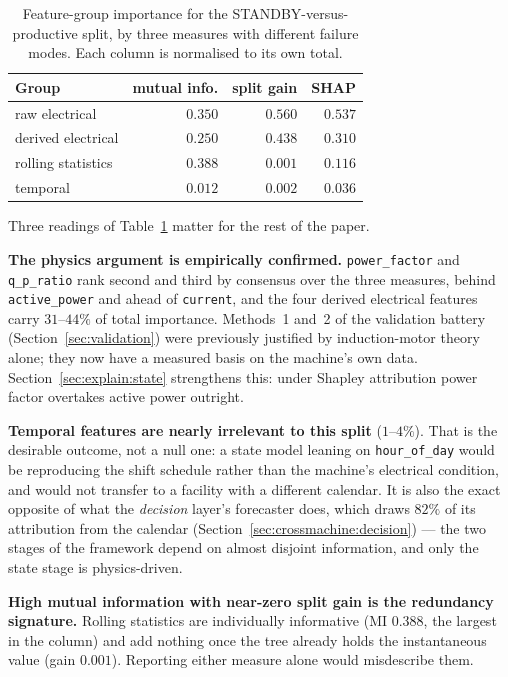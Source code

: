 \begin{table}[t]
\centering
\caption{Feature-group importance for the STANDBY-versus-productive
split, by three measures with different failure modes. Each column is
normalised to its own total.}
\label{tab:feature-groups}
\small
\begin{tabular}{@{}lrrr@{}}
\toprule
Group & mutual info. & split gain & SHAP \\
\midrule
raw electrical      & $0.350$ & $\mathbf{0.560}$ & $\mathbf{0.537}$ \\
derived electrical  & $0.250$ & $0.438$ & $0.310$ \\
rolling statistics  & $\mathbf{0.388}$ & $0.001$ & $0.116$ \\
temporal            & $0.012$ & $0.002$ & $0.036$ \\
\bottomrule
\end{tabular}
\end{table}

Three readings of Table~\ref{tab:feature-groups} matter for the rest of
the paper.

\textbf{The physics argument is empirically confirmed.}
\texttt{power\_factor} and \texttt{q\_p\_ratio} rank second and third by
consensus over the three measures, behind \texttt{active\_power} and
ahead of \texttt{current}, and the four derived electrical features
carry $31$--$44\%$ of total importance. Methods~1 and~2 of the
validation battery (Section~\ref{sec:validation}) were previously
justified by induction-motor theory alone; they now have a measured
basis on the machine's own data. Section~\ref{sec:explain:state}
strengthens this: under Shapley attribution power factor overtakes
active power outright.

\textbf{Temporal features are nearly irrelevant to this split}
($1$--$4\%$). That is the desirable outcome, not a null one: a state
model leaning on \texttt{hour\_of\_day} would be reproducing the shift
schedule rather than the machine's electrical condition, and would not
transfer to a facility with a different calendar. It is also the exact
opposite of what the \emph{decision} layer's forecaster does, which
draws $82\%$ of its attribution from the calendar
(Section~\ref{sec:crossmachine:decision}) --- the two stages of the
framework depend on almost disjoint information, and only the state
stage is physics-driven.

\textbf{High mutual information with near-zero split gain is the
redundancy signature.} Rolling statistics are individually informative
(MI $0.388$, the largest in the column) and add nothing once the tree
already holds the instantaneous value (gain $0.001$). Reporting either
measure alone would misdescribe them.

